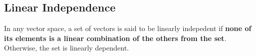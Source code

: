 \subsection{Linear Independence}
\begin{definition}
	In any vector space, a set of vectors is said to be linearly indepedent if \textbf{none of its elements is a linear combination of the others from the set}. Otherwise, the set is linearly dependent.
\end{definition} 
